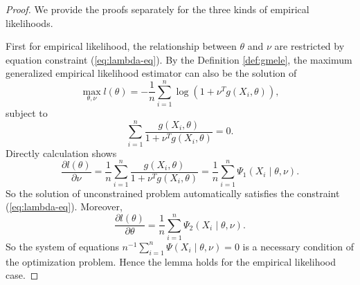 \begin{proof}
We provide the proofs separately for the three kinds
of empirical likelihoods. 

First for empirical likelihood, the relationship between $\theta$
and $\nu$ are restricted by equation constraint (\ref{eq:lambda-eq}).
By the Definition \ref{def:gmele}, the maximum generalized empirical
likelihood estimator can also be the solution of 
\[
\max_{\theta,\nu}l\left(\theta\right)=-\frac{1}{n}\sum_{i=1}^{n}\log\left(1+\nu^{T}g\left(X_{i},\theta\right)\right),
\]
subject to
\[
\sum_{i=1}^{n}\frac{g\left(X_{i},\theta\right)}{1+\nu^{T}g\left(X_{i},\theta\right)}=0.
\]
Directly calculation shows 
\[
\frac{\partial l\left(\theta\right)}{\partial\nu}=\frac{1}{n}\sum_{i=1}^{n}\frac{g\left(X_{i},\theta\right)}{1+\nu^{T}g\left(X_{i},\theta\right)}=\frac{1}{n}\sum_{i=1}^{n}\Psi_{1}\left(X_{i}\mid\theta,\nu\right).
\]
So the solution of unconstrained problem automatically satisfies the
constraint (\ref{eq:lambda-eq}). Moreover, 
\[
\frac{\partial l\left(\theta\right)}{\partial\theta}=\frac{1}{n}\sum_{i=1}^{n}\Psi_{2}\left(X_{i}\mid\theta,\nu\right).
\]
So the system of equations $n^{-1}\sum_{i=1}^{n}\Psi\left(X_{i}\mid\theta,\nu\right)=0$
is a necessary condition of the optimization problem.
Hence the lemma holds for the empirical likelihood case.


\end{proof}
